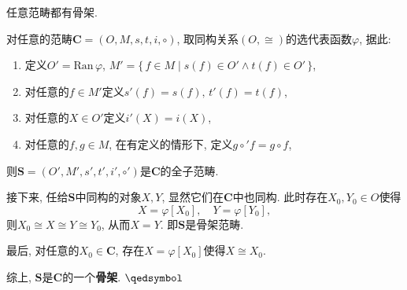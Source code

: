 \documentclass[UTF8]{ctexart}
\begin{document}
任意范畴都有骨架.


对任意的范畴$\mathbf{C}=(O,M,s,t,i,\circ)$,
取同构关系$(O,\cong)$的选代表函数$\varphi$, 据此:
\begin{enumerate}
    \item 定义$O'=\mathrm{Ran}\,\varphi$,
    $M'=\{\,f\in M\mid s(f)\in O'\land t(f)\in O'\,\}$,
    \item 对任意的$f\in M'$定义$s'(f)=s(f),\,t'(f)=t(f)$,
    \item 对任意的$X\in O'$定义$i'(X)=i(X)$,
    \item 对任意的$f,g\in M$, 在有定义的情形下, 定义$g\circ'f=g\circ f$,
\end{enumerate}
则$\mathbf{S}=(O',M',s',t',i',\circ')$是$\mathbf{C}$的全子范畴.

接下来, 任给$\mathbf{S}$中同构的对象$X,Y$, 显然它们在$\mathbf{C}$中也同构.
此时存在$X_0,Y_0\in O$使得
\[
    X=\varphi[X_0],\quad Y=\varphi[Y_0],
\]
则$X_0\cong X\cong Y\cong Y_0$, 从而$X=Y$. 即$\mathbf{S}$是骨架范畴.

最后, 对任意的$X_0\in\mathbf{C}$, 存在$X=\varphi[X_0]$使得$X\cong X_0$.

综上, $\mathbf{S}$是$\mathbf{C}$的一个\textbf{骨架}. \hfill $\qedsymbol$
\end{document}
